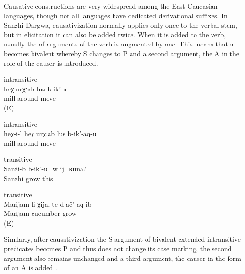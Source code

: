 Causative constructions are very widespread among the East Caucasian languages, though not all languages have dedicated derivational suffixes. In Sanzhi Dargwa, causativization normally applies only once to the verbal stem, but in elicitation it can also be added twice. When it is added to the verb, usually the  of arguments of the verb is augmented by one. This means that a  becomes bivalent whereby S changes to P and a second argument, the  A in the role of the causer is introduced. 

\begin{exe}
	\ex	\label{ex:This mill spins around} intransitive \\
	\gll	heχ	urχːab	lus	b-ik'-u\\
			mill	around	move\\
	\glt	{} (E)


	\ex	\label{ex:This makes the mill spin around} intransitive \\
	\gll	heχ-i-l	heχ	urχːab	lus	b-ik'-aq-u\\
				mill	around	move\\
	\glt	{}

	\ex	\label{ex:‎‎Something like this grows in Sanzhi} transitive \\
	\gll	Sanži-b	b-ik'-u=w	ij=ʁuna?\\
		Sanzhi	grow	this\\
	\glt	{}
	
	\ex	\label{ex:‎Marijam was growing cucumbers} transitive \\
	\gll	Marijam-li	χijal-te	d-ač'-aq-ib\\
		Marijam	cucumber	grow\\
	\glt	{} (E)
\end{exe}

Similarly, after causativization the S argument of bivalent extended intransitive predicates  becomes P and thus does not change its case marking, the second argument also remains unchanged and a third argument, the causer in the form of an  A is added . 


